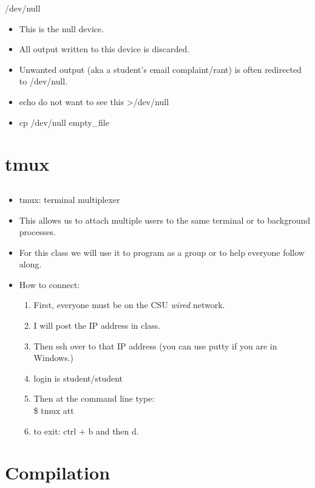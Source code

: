 \documentclass{beamer}
\begin{document}
\begin{frame}{/dev/null}
\begin{itemize}
\item This is the null device.
\item All output written to this device is discarded.
\item Unwanted output (aka a student's email complaint/rant) is often redirected to /dev/null.
\item echo do not want to see this >/dev/null
\item cp /dev/null empty\_file
\end{itemize}
\end{frame}

\section{tmux}
\subsection{}
\begin{frame}
\begin{itemize}
\item tmux: terminal multiplexer
\item This allows us to attach multiple users to the same terminal or to background processes.
\item For this class we will use it to program as a group or to help everyone follow along.
\item How to connect:
\begin{enumerate}
\item First, everyone must be on the CSU \textit{wired} network.
\item I will post the IP address in class.
\item Then ssh over to that IP address (you can use putty if you are in Windows.)
\item login is student/student
\item Then at the command line type: \\
\$ tmux att
\item to exit: ctrl + b and then d.
\end{enumerate}
\end{itemize}
\end{frame}

\section{Compilation}
\end{document}

